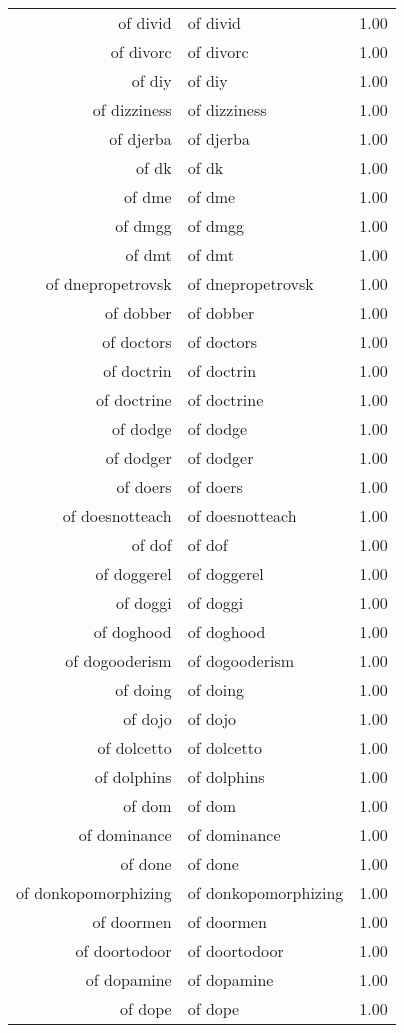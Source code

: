 \begin{table}[ht]
\begin{tabular}{rlr}
  of divid & of divid & 1.00 \\ 
  of divorc & of divorc & 1.00 \\ 
  of diy & of diy & 1.00 \\ 
  of dizziness & of dizziness & 1.00 \\ 
  of djerba & of djerba & 1.00 \\ 
  of dk & of dk & 1.00 \\ 
  of dme & of dme & 1.00 \\ 
  of dmgg & of dmgg & 1.00 \\ 
  of dmt & of dmt & 1.00 \\ 
  of dnepropetrovsk & of dnepropetrovsk & 1.00 \\ 
  of dobber & of dobber & 1.00 \\ 
  of doctors & of doctors & 1.00 \\ 
  of doctrin & of doctrin & 1.00 \\ 
  of doctrine & of doctrine & 1.00 \\ 
  of dodge & of dodge & 1.00 \\ 
  of dodger & of dodger & 1.00 \\ 
  of doers & of doers & 1.00 \\ 
  of doesnotteach & of doesnotteach & 1.00 \\ 
  of dof & of dof & 1.00 \\ 
  of doggerel & of doggerel & 1.00 \\ 
  of doggi & of doggi & 1.00 \\ 
  of doghood & of doghood & 1.00 \\ 
  of dogooderism & of dogooderism & 1.00 \\ 
  of doing & of doing & 1.00 \\ 
  of dojo & of dojo & 1.00 \\ 
  of dolcetto & of dolcetto & 1.00 \\ 
  of dolphins & of dolphins & 1.00 \\ 
  of dom & of dom & 1.00 \\ 
  of dominance & of dominance & 1.00 \\ 
  of done & of done & 1.00 \\ 
  of donkopomorphizing & of donkopomorphizing & 1.00 \\ 
  of doormen & of doormen & 1.00 \\ 
  of doortodoor & of doortodoor & 1.00 \\ 
  of dopamine & of dopamine & 1.00 \\ 
  of dope & of dope & 1.00 \\ 

\end{tabular}
\end{table}
